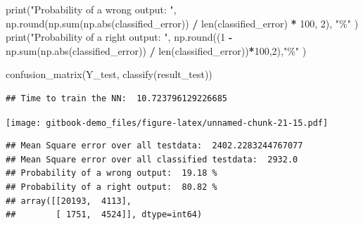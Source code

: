 \documentclass[
]{book}
\newenvironment{Shaded}{\begin{snugshade}}{\end{snugshade}}
\newcommand{\BuiltInTok}[1]{#1}
\newcommand{\DecValTok}[1]{\textcolor[rgb]{0.00,0.00,0.81}{#1}}
\newcommand{\NormalTok}[1]{#1}
\newcommand{\OperatorTok}[1]{\textcolor[rgb]{0.81,0.36,0.00}{\textbf{#1}}}
\newcommand{\StringTok}[1]{\textcolor[rgb]{0.31,0.60,0.02}{#1}}
\begin{document}
\begin{Shaded}
\begin{Highlighting}[]
\BuiltInTok{print}\NormalTok{(}\StringTok{"Probability of a wrong output: "}\NormalTok{, np.}\BuiltInTok{round}\NormalTok{(np.}\BuiltInTok{sum}\NormalTok{(np.}\BuiltInTok{abs}\NormalTok{(classified\_error)) }\OperatorTok{/} \BuiltInTok{len}\NormalTok{(classified\_error) }\OperatorTok{*} \DecValTok{100}\NormalTok{, }\DecValTok{2}\NormalTok{), }\StringTok{"\%"}\NormalTok{ )}
\BuiltInTok{print}\NormalTok{(}\StringTok{"Probability of a right output: "}\NormalTok{, np.}\BuiltInTok{round}\NormalTok{((}\DecValTok{1} \OperatorTok{{-}}\NormalTok{ np.}\BuiltInTok{sum}\NormalTok{(np.}\BuiltInTok{abs}\NormalTok{(classified\_error)) }\OperatorTok{/} \BuiltInTok{len}\NormalTok{(classified\_error))}\OperatorTok{*}\DecValTok{100}\NormalTok{,}\DecValTok{2}\NormalTok{),}\StringTok{"\%"}\NormalTok{ )}


\NormalTok{confusion\_matrix(Y\_test, classify(result\_test))}
\end{Highlighting}
\end{Shaded}

\begin{verbatim}
## Time to train the NN:  10.723796129226685
\end{verbatim}

\texttt{[image: gitbook-demo\_files/figure-latex/unnamed-chunk-21-15.pdf]}

\begin{verbatim}
## Mean Square error over all testdata:  2402.2283244767077
## Mean Square error over all classified testdata:  2932.0
## Probability of a wrong output:  19.18 %
## Probability of a right output:  80.82 %
## array([[20193,  4113],
##        [ 1751,  4524]], dtype=int64)
\end{verbatim}
\end{document}

